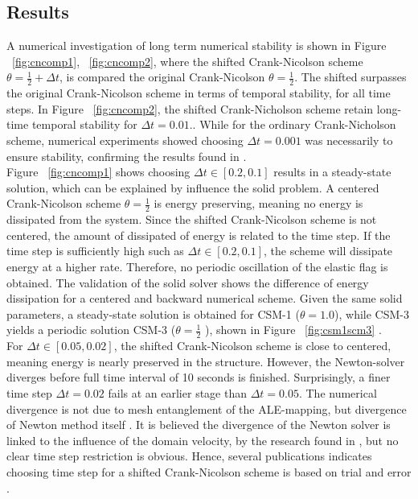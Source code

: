 \subsection*{Results}
A numerical investigation of long term numerical stability is shown in Figure ~\ref{fig:cncomp1}, ~\ref{fig:cncomp2}, where the shifted Crank-Nicolson scheme $\theta = \frac{1}{2} + \Delta t$, is compared the original Crank-Nicolson $\theta = \frac{1}{2}$. The shifted surpasses the original Crank-Nicolson scheme in terms of temporal stability, for all time steps. In Figure ~\ref{fig:cncomp2}, the shifted Crank-Nicholson scheme retain long-time temporal stability for $\Delta t = 0.01$.. While for the ordinary Crank-Nicholson scheme, numerical experiments showed choosing $\Delta t = 0.001$ was necessarily to ensure stability, confirming the results found in \cite{Wicka}. \\
Figure ~\ref{fig:cncomp1} shows choosing $\Delta t \in [0.2, 0.1]$ results in a steady-state solution, which can be explained by influence the solid problem. A centered Crank-Nicolson scheme $\theta= \frac{1}{2}$ is energy preserving, meaning no energy is dissipated from the system. Since the shifted Crank-Nicolson scheme is not centered, the amount of dissipated of energy is related to the time step. If the time step is sufficiently high such as $\Delta t \in [0.2, 0.1]$, the scheme will dissipate energy at a higher rate. Therefore, no periodic oscillation of the elastic flag is obtained. The validation of the solid solver shows the difference of energy dissipation for a centered and backward numerical scheme. Given the same solid parameters, a steady-state solution is obtained for CSM-1 ($\theta = 1.0 $), while CSM-3 yields a periodic solution CSM-3 ($\theta = \frac{1}{2}$ ), shown in Figure ~\ref{fig:csm1scm3} .\\
For $\Delta t \in [0.05, 0.02]$, the shifted Crank-Nicolson scheme is close to centered, meaning energy is nearly preserved in the structure. However, the Newton-solver diverges before full time interval of 10 seconds is finished. Surprisingly, a finer time step $\Delta t = 0.02$ fails at an earlier stage than $\Delta t = 0.05$. The numerical divergence is not due to mesh entanglement of the ALE-mapping, but divergence of Newton method itself \cite{Richter2015}. It is believed the divergence of the Newton solver is linked to the influence of the domain velocity, by the research found in \cite{Formaggia2004}, but no clear time step restriction is obvious. Hence, several publications indicates choosing time step for a shifted Crank-Nicolson scheme is based on trial and error \cite{Wicka, Wick2013a}. 
